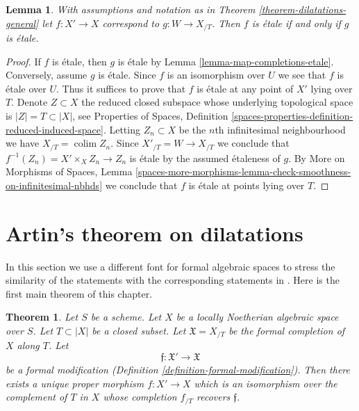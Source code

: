 \documentclass{stacks-project}
\newenvironment{reference}{\comment}{\endcomment}
\theoremstyle{plain}
\newtheorem{theorem}[subsection]{Theorem}
\newtheorem{lemma}[subsection]{Lemma}
\theoremstyle{definition}
\theoremstyle{remark}
\numberwithin{equation}{subsection}
\def\colim{\mathop{\mathrm{colim}}\nolimits}
\begin{document}
\begin{lemma}
\label{lemma-output-etale}
With assumptions and notation as in Theorem \ref{theorem-dilatations-general}
let $f : X' \to X$ correspond to $g : W \to X_{/T}$.
Then $f$ is \'etale if and only if $g$ is \'etale.
\end{lemma}

\begin{proof}
If $f$ is \'etale, then $g$ is \'etale by
Lemma \ref{lemma-map-completions-etale}.
Conversely, assume $g$ is \'etale.
Since $f$ is an isomorphism over $U$ we see that $f$ is \'etale
over $U$. Thus it suffices to prove that $f$ is \'etale
at any point of $X'$ lying over $T$. Denote $Z \subset X$
the reduced closed subspace whose underlying topological
space is $|Z| = T \subset |X|$, see
Properties of Spaces, Definition
\ref{spaces-properties-definition-reduced-induced-space}.
Letting $Z_n \subset X$ be the $n$th infinitesimal neighbourhood
we have $X_{/T} = \colim Z_n$. Since $X'_{/T} = W \to X_{/T}$
we conclude that $f^{-1}(Z_n) = X' \times_X Z_n \to Z_n$
is \'etale by the assumed \'etaleness of $g$.
By More on Morphisms of Spaces, Lemma
\ref{spaces-more-morphisms-lemma-check-smoothness-on-infinitesimal-nbhds}
we conclude that $f$ is \'etale at points lying over $T$.
\end{proof}





\section{Artin's theorem on dilatations}
\label{section-dilatations}

\noindent
In this section we use a different font for formal algebraic spaces
to stress the similarity of the statements with the corresponding
statements in \cite{ArtinII}. Here is the first main theorem of this chapter.

\begin{theorem}
\label{theorem-dilatations}
\begin{reference}
\cite[Theorem 3.2]{ArtinII}
\end{reference}
Let $S$ be a scheme. Let $X$ be a locally Noetherian algebraic space over $S$.
Let $T \subset |X|$ be a closed subset. Let
$\mathfrak X = X_{/T}$
be the formal completion of $X$ along $T$. Let
$$
\mathfrak f : \mathfrak X' \to \mathfrak X
$$
be a formal modification (Definition \ref{definition-formal-modification}).
Then there exists a unique proper morphism $f : X' \to X$ which is an
isomorphism over the complement of $T$ in $X$ whose completion $f_{/T}$
recovers $\mathfrak f$. 
\end{theorem}
\end{document}

